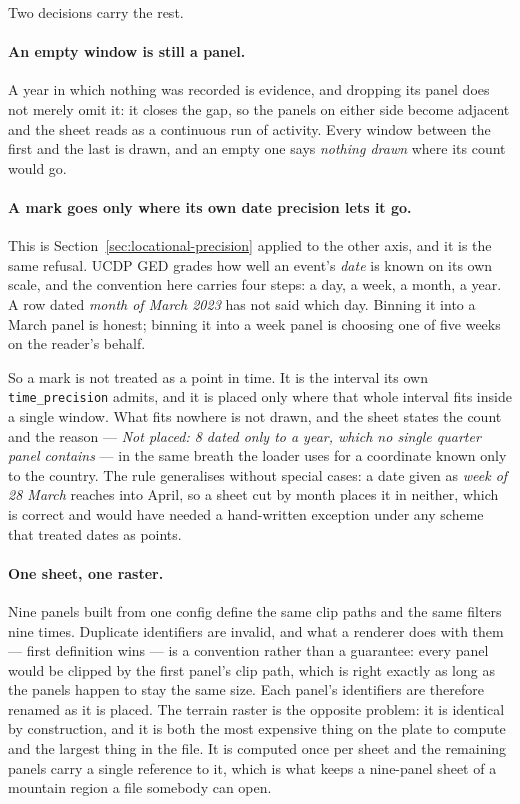 \documentclass[11pt]{article}
\begin{document}
Two decisions carry the rest.

\paragraph{An empty window is still a panel.} A year in which nothing was
recorded is evidence, and dropping its panel does not merely omit it: it closes
the gap, so the panels on either side become adjacent and the sheet reads as a
continuous run of activity. Every window between the first and the last is
drawn, and an empty one says \emph{nothing drawn} where its count would go.

\paragraph{A mark goes only where its own date precision lets it go.} This is
Section~\ref{sec:locational-precision} applied to the other axis, and it is the
same refusal. UCDP GED grades how well an event's \emph{date} is known on its
own scale, and the convention here carries four steps: a day, a week, a month,
a year. A row dated \emph{month of March 2023} has not said which day. Binning
it into a March panel is honest; binning it into a week panel is choosing one
of five weeks on the reader's behalf.

So a mark is not treated as a point in time. It is the interval its own
\texttt{time\_precision} admits, and it is placed only where that whole
interval fits inside a single window. What fits nowhere is not drawn, and the
sheet states the count and the reason --- \emph{Not placed: 8 dated only to a
year, which no single quarter panel contains} --- in the same breath the loader
uses for a coordinate known only to the country. The rule generalises without
special cases: a date given as \emph{week of 28 March} reaches into April, so a
sheet cut by month places it in neither, which is correct and would have needed
a hand-written exception under any scheme that treated dates as points.

\paragraph{One sheet, one raster.} Nine panels built from one config define the
same clip paths and the same filters nine times. Duplicate identifiers are
invalid, and what a renderer does with them --- first definition wins --- is a
convention rather than a guarantee: every panel would be clipped by the first
panel's clip path, which is right exactly as long as the panels happen to stay
the same size. Each panel's identifiers are therefore renamed as it is placed.
The terrain raster is the opposite problem: it is identical by construction,
and it is both the most expensive thing on the plate to compute and the largest
thing in the file. It is computed once per sheet and the remaining panels carry
a single reference to it, which is what keeps a nine-panel sheet of a mountain
region a file somebody can open.
\end{document}
